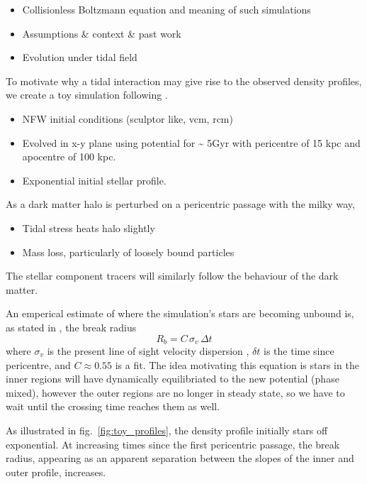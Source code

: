 \begin{itemize}
\tightlist
\item
  Collisionless Boltzmann equation and meaning of such simulations
\item
  Assumptions \& context \& past work
\item
  Evolution under tidal field
\end{itemize}

To motivate why a tidal interaction may give rise to the observed
density profiles, we create a toy simulation following \citet{PNM2008}.

\begin{itemize}
\item
  NFW initial conditions (sculptor like, vcm, rcm)
\item
  Evolved in x-y plane using \citet{EP2020} potential for
  \textasciitilde{} 5Gyr with pericentre of 15 kpc and apocentre of 100
  kpc.
\item
  Exponential initial stellar profile.
\end{itemize}

As a dark matter halo is perturbed on a pericentric passage with the
milky way,

\begin{itemize}
\tightlist
\item
  Tidal stress heats halo slightly
\item
  Mass loss, particularly of loosely bound particles
\end{itemize}

The stellar component tracers will similarly follow the behaviour of the
dark matter.

An emperical estimate of where the simulation's stars are becoming
unbound is, as stated in \citet{PNM2008}, the break radius
\begin{equation}
R_b = C\,\sigma_{v}\,\Delta t
\end{equation} where \(\sigma_v\) is the present line of sight velocity
dispersion , \(\delta t\) is the time since pericentre, and
\(C \approx 0.55\) is a fit. The idea motivating this equation is stars
in the inner regions will have dynamically equilibriated to the new
potential (phase mixed), however the outer regions are no longer in
steady state, so we have to wait until the crossing time reaches them as
well.

As illustrated in fig.~\ref{fig:toy_profiles}, the density profile
initially stars off exponential. At increasing times since the first
pericentric passage, the break radius, appearing as an apparent
separation between the slopes of the inner and outer profile, increases.

